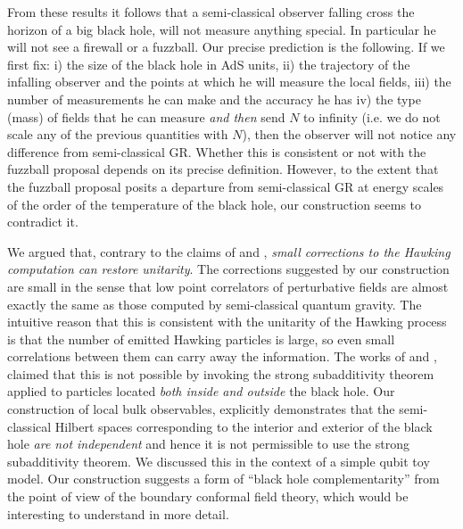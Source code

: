 \vskip10pt

 From these results it follows that a semi-classical observer falling cross the horizon of a big black hole,  will not measure anything special. In particular he will not see a firewall or a fuzzball. Our precise prediction is the following. If we first fix: i) the size of the black hole in AdS units,  ii) the trajectory of the infalling observer and the points at which he will measure the local fields, iii) the number of measurements he can make and the accuracy he has iv) the type (mass) of fields that he can measure {\it and then} send $N$ to infinity (i.e. we do not scale any of the previous quantities with $N$), then the observer will not notice any difference from semi-classical GR. Whether this is consistent or not with the fuzzball proposal depends on its precise definition. However, to the extent that the fuzzball proposal posits a departure from
semi-classical GR at energy scales of the order of the temperature of the black hole, our construction seems to contradict it.

\vskip10pt

  We argued that, contrary to the claims of \cite{Mathur:2012np} and \cite{Almheiri:2012rt}, {\it small corrections to the Hawking computation can restore
unitarity}. The corrections suggested by our construction are small in the sense that low point correlators of perturbative fields are almost exactly the same as those computed by semi-classical quantum gravity.  The intuitive reason that this is consistent with the unitarity of the Hawking process is that the number of emitted Hawking particles is large, so even small correlations between them can carry away the information. 
The works of \cite{Mathur:2012np} and \cite{Almheiri:2012rt}, claimed that this is not possible by invoking the strong subadditivity theorem applied to particles located {\it both inside and outside}  the black hole.
Our construction of local bulk observables, explicitly demonstrates that the semi-classical Hilbert spaces corresponding to the interior and exterior of the black hole {\it are not independent}
and hence it is not permissible to use the strong subadditivity theorem.
We discussed this in the context of a simple qubit toy model. Our construction suggests a form of ``black hole complementarity'' from the point of view of the boundary conformal field theory, which would be interesting to understand in more detail.

